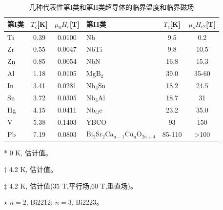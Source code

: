 \begin{table}[htbp]\small%
  \centering
  \caption{几种代表性第I类和第II类超导体的临界温度和临界磁场} \label{criticalparameters}
\begin{threeparttable}
  \begin{tabular}{|l|c|c||l|c|c|}
    \hline
    第I类 & $T_c$[K] & $\mu_0 H_c$\tnote{*}[T] & 第II类 & $T_c$[K] & $\mu_o H_{c2}$\tnote{*}[T] \\ \hline 
    Ti & 0.39 & 0.0100 & Nb & 9.5 & 0.2\tnote{*} \\ \hline
    Zr & 0.55 & 0.0047 & NbTi & 9.8 & 10.5\tnote{$\dagger$} \\ \hline
    Zn & 0.85 & 0.0054 &NbN & 16.8 & 15.3\tnote{$\dagger$} \\ \hline
    Al & 1.18 & 0.0105&$\mathrm{MgB_2}$ & 39.0 & 35-60\tnote{$\ddagger$}\\ \hline
    In & 3.41 & 0.0281 & $\mathrm{Nb_3Sn}$ & 18.2 & 24.5\tnote{$\dagger$}  \\ \hline
    Sn & 3.72 & 0.0305  & $\mathrm{Nb_3Al}$ & 18.7 & 31\tnote{$\dagger$}\\ \hline
    Hg & 4.15 & 0.0411  & $\mathrm{Nb_Ge}$ & 23.2 & 35.0\tnote{$\dagger$}\\ \hline
    V & 5.38 & 0.1403& YBCO & 93 & 150\tnote{*}\\ \hline
    Pb & 7.19 & 0.0803 & $\mathrm{Bi_2Sr_2Ca_{n-1}Cu_{n}O_{2n+4}}$\tnote{$\star$} & 85-110 & >100\tnote{*} \\
    \hline
  \end{tabular}
 \begin{tablenotes}
        \footnotesize
        \item[*] 0 K, 估计值。 %
        \item[$\dagger$] 4.2 K, 估计值。%
        \item[$\ddagger$] 4.2 K, 估计值(35 T,平行场,60 T,垂直场)。%
        \item[$\star$] $n=2$, Bi2212; $n=3$, Bi2223。%
      \end{tablenotes}
    \end{threeparttable}
\end{table}


